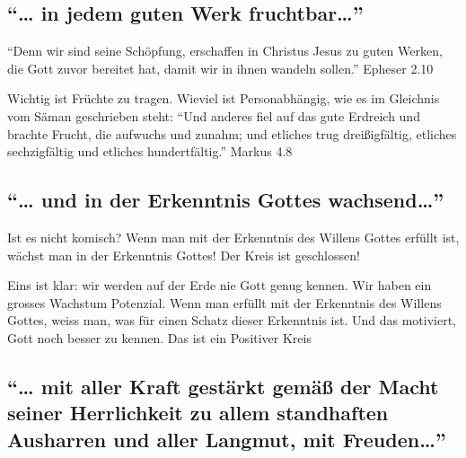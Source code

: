 \documentclass[
  12pt,
]{krantz}
\begin{document}
\hypertarget{in-jedem-guten-werk-fruchtbar}{%
\subsection{\texorpdfstring{``\ldots{} in jedem guten Werk fruchtbar\ldots{}''}{``\ldots{} in jedem guten Werk fruchtbar\ldots''}}\label{in-jedem-guten-werk-fruchtbar}}

``Denn wir sind seine Schöpfung, erschaffen in Christus Jesus zu guten Werken, die Gott zuvor bereitet hat, damit wir in ihnen wandeln sollen.'' Epheser 2.10

Wichtig ist Früchte zu tragen. Wieviel ist Personabhängig, wie es im Gleichnis vom Säman geschrieben steht: ``Und anderes fiel auf das gute Erdreich und brachte Frucht, die aufwuchs und zunahm; und etliches trug dreißigfältig, etliches sechzigfältig und etliches hundertfältig.'' Markus 4.8

\hypertarget{und-in-der-erkenntnis-gottes-wachsend}{%
\subsection{\texorpdfstring{``\ldots{} und in der Erkenntnis Gottes wachsend\ldots{}''}{``\ldots{} und in der Erkenntnis Gottes wachsend\ldots''}}\label{und-in-der-erkenntnis-gottes-wachsend}}

Ist es nicht komisch? Wenn man mit der Erkenntnis des Willens Gottes erfüllt ist, wächst man in der Erkenntnis Gottes! Der Kreis ist geschlossen!

Eins ist klar: wir werden auf der Erde nie Gott genug kennen. Wir haben ein grosses Wachstum Potenzial. Wenn man erfüllt mit der Erkenntnis des Willens Gottes, weiss man, was für einen Schatz dieser Erkenntnis ist. Und das motiviert, Gott noch besser zu kennen. Das ist ein Positiver Kreis

\hypertarget{mit-aller-kraft-gestuxe4rkt-gemuxe4uxdf-der-macht-seiner-herrlichkeit-zu-allem-standhaften-ausharren-und-aller-langmut-mit-freuden}{%
\subsection{\texorpdfstring{``\ldots{} mit aller Kraft gestärkt gemäß der Macht seiner Herrlichkeit zu allem standhaften Ausharren und aller Langmut, mit Freuden\ldots{}''}{``\ldots{} mit aller Kraft gestärkt gemäß der Macht seiner Herrlichkeit zu allem standhaften Ausharren und aller Langmut, mit Freuden\ldots''}}\label{mit-aller-kraft-gestuxe4rkt-gemuxe4uxdf-der-macht-seiner-herrlichkeit-zu-allem-standhaften-ausharren-und-aller-langmut-mit-freuden}}
\end{document}
